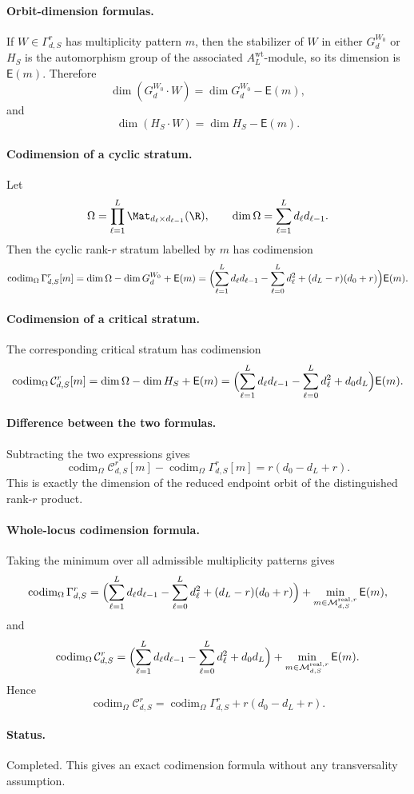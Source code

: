 \paragraph{Orbit-dimension formulas.}
If \(W\in \Gamma_{d,S}^r\) has multiplicity pattern \(m\), then the stabilizer
of \(W\) in either \(G_d^{W_0}\) or \(H_S\) is the automorphism group of the
associated \(A_L^{\mathrm{wt}}\)-module, so its dimension is \(\mathsf E(m)\).
Therefore
\[
\dim(G_d^{W_0}\cdot W)=\dim G_d^{W_0}-\mathsf E(m),
\]
and
\[
\dim(H_S\cdot W)=\dim H_S-\mathsf E(m).
\]

\paragraph{Codimension of a cyclic stratum.}
Let
\[
\Omega=\prod_{\ell=1}^L \Mat_{d_\ell\times d_{\ell-1}}(\R),
\qquad
\dim \Omega=\sum_{\ell=1}^L d_\ell d_{\ell-1}.
\]
Then the cyclic rank-\(r\) stratum labelled by \(m\) has codimension
\[
\operatorname{codim}_{\Omega}\Gamma_{d,S}^r[m]
=
\dim \Omega-\dim G_d^{W_0}+\mathsf E(m)
=
\Bigl(
\sum_{\ell=1}^L d_\ell d_{\ell-1}
-\sum_{\ell=0}^L d_\ell^2
+(d_L-r)(d_0+r)
\Bigr)
\mathsf E(m).
\]

\paragraph{Codimension of a critical stratum.}
The corresponding critical stratum has codimension
\[
\operatorname{codim}_{\Omega}\mathcal C_{d,S}^r[m]
=
\dim \Omega-\dim H_S+\mathsf E(m)
=
\Bigl(
\sum_{\ell=1}^L d_\ell d_{\ell-1}
-\sum_{\ell=0}^L d_\ell^2
+d_0d_L
\Bigr)
\mathsf E(m).
\]

\paragraph{Difference between the two formulas.}
Subtracting the two expressions gives
\[
\operatorname{codim}_{\Omega}\mathcal C_{d,S}^r[m]
-\operatorname{codim}_{\Omega}\Gamma_{d,S}^r[m]
=
r(d_0-d_L+r).
\]
This is exactly the dimension of the reduced endpoint orbit of the distinguished
rank-\(r\) product.

\paragraph{Whole-locus codimension formula.}
Taking the minimum over all admissible multiplicity patterns gives
\[
\operatorname{codim}_{\Omega}\Gamma_{d,S}^r
=
\Bigl(
\sum_{\ell=1}^L d_\ell d_{\ell-1}
-\sum_{\ell=0}^L d_\ell^2
+(d_L-r)(d_0+r)
\Bigr)
+
\min_{m\in \mathcal M_{d,S}^{\mathrm{real},r}}\mathsf E(m),
\]
and
\[
\operatorname{codim}_{\Omega}\mathcal C_{d,S}^r
=
\Bigl(
\sum_{\ell=1}^L d_\ell d_{\ell-1}
-\sum_{\ell=0}^L d_\ell^2
+d_0d_L
\Bigr)
+
\min_{m\in \mathcal M_{d,S}^{\mathrm{real},r}}\mathsf E(m).
\]
Hence
\[
\operatorname{codim}_{\Omega}\mathcal C_{d,S}^r
=
\operatorname{codim}_{\Omega}\Gamma_{d,S}^r
+
r(d_0-d_L+r).
\]

\paragraph{Status.}
Completed. This gives an exact codimension formula without any transversality
assumption.
